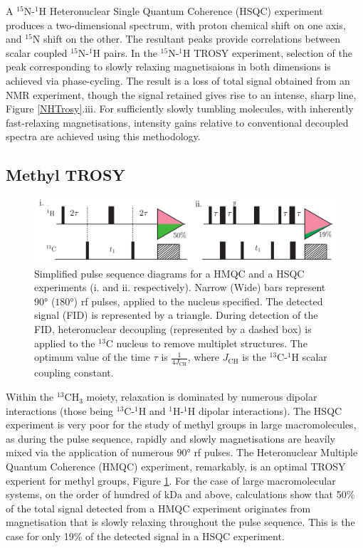 A $^{15}$N-$^{1}$H Heteronuclear Single Quantum Coherence (HSQC) experiment produces a two-dimensional spectrum, with proton chemical shift on one axis, and $^{15}$N shift on the other. The resultant peaks provide correlations between scalar coupled $^{15}$N-$^{1}$H pairs. In the $^{15}$N-$^1$H TROSY experiment, selection of the peak corresponding to slowly relaxing magnetisaions in both dimensions is achieved via phase-cycling. The result is a loss of total signal obtained from an NMR experiment, though the signal retained gives rise to an intense, sharp line, Figure \ref{NHTrosy}.iii. For sufficiently slowly tumbling molecules, with inherently fast-relaxing magnetisations, intensity gains relative to conventional decoupled spectra are achieved using this methodology.
\subsection{Methyl TROSY}
\begin{figure}
\centering
\includegraphics[scale=0.4]{./Figures/SimonsFigs/HSQCHMQC.pdf}
\caption{Simplified pulse sequence diagrams for a HMQC and a HSQC experiments (i. and ii. respectively). Narrow (Wide) bars represent $\ang{90}$ ($\ang{180}$) rf pulses, applied to the nucleus specified. The detected signal (FID) is represented by a triangle. During detection of the FID, heteronuclear decoupling (represented by a dashed box) is applied to the $^{13}$C nucleus to remove multiplet structures. The optimum value of the time $\tau$ is $\frac{1}{4J_{\text{CH}}}$, where $J_{\text{CH}}$ is the $^{13}$C-$^1$H scalar coupling constant.}
\label{HSQCHMQC}
\end{figure}
Within the $^{13}$CH$_{3}$ moiety, relaxation is dominated by numerous dipolar interactions (those being $^{13}$C-$^1$H and $^1$H-$^1$H dipolar interactions). The HSQC experiment is very poor for the study of methyl groups in large macromolecules, as during the pulse sequence, rapidly and slowly magnetisations are heavily mixed via the application of numerous $\ang{90}$ rf pulses. The Heteronuclear Multiple Quantum Coherence (HMQC) experiment, remarkably, is an optimal TROSY experient for methyl groups\cite{RN17, RN37}, Figure \ref{HSQCHMQC}. For the case of large macromolecular systems, on the order of hundred of $\si{\kilo\dalton}$ and above, calculations show that 50\% of the total signal detected from a HMQC experiment originates from magnetisation that is slowly relaxing throughout the pulse sequence. This is the case for only 19\% of the detected signal in a HSQC experiment\cite{RN17}.
